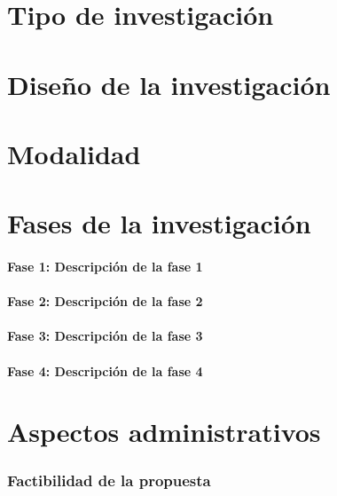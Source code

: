 \section{Tipo de investigación}
	
	\blindtext

\section{Diseño de la investigación}

	\blindtext

\section{Modalidad}

	\blindtext

\section{Fases de la investigación}
	
	\paragraph{Fase 1: Descripción de la fase 1}
		
		\blindtext
		
	\paragraph{Fase 2: Descripción de la fase 2}
		
		\blindtext	
		
	\paragraph{Fase 3: Descripción de la fase 3}
		
		\blindtext
		
	\paragraph{Fase 4: Descripción de la fase 4}
		
		\blindtext

\section{Aspectos administrativos}

	\subsubsection{Factibilidad de la propuesta}

